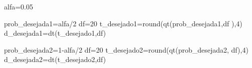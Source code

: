 \documentclass[
]{book}
\newenvironment{Shaded}{\begin{snugshade}}{\end{snugshade}}
\newcommand{\DecValTok}[1]{\textcolor[rgb]{0.00,0.00,0.81}{#1}}
\newcommand{\FloatTok}[1]{\textcolor[rgb]{0.00,0.00,0.81}{#1}}
\newcommand{\FunctionTok}[1]{\textcolor[rgb]{0.00,0.00,0.00}{#1}}
\newcommand{\NormalTok}[1]{#1}
\newcommand{\OtherTok}[1]{\textcolor[rgb]{0.56,0.35,0.01}{#1}}
\newcommand{\SpecialCharTok}[1]{\textcolor[rgb]{0.00,0.00,0.00}{#1}}
\begin{document}
\hfill\break

\begin{Shaded}
\begin{Highlighting}[]
\NormalTok{alfa}\OtherTok{=}\FloatTok{0.05}

\NormalTok{prob\_desejada1}\OtherTok{=}\NormalTok{alfa}\SpecialCharTok{/}\DecValTok{2}
\NormalTok{df}\OtherTok{=}\DecValTok{20}
\NormalTok{t\_desejado1}\OtherTok{=}\FunctionTok{round}\NormalTok{(}\FunctionTok{qt}\NormalTok{(prob\_desejada1,df ),}\DecValTok{4}\NormalTok{)}
\NormalTok{d\_desejada1}\OtherTok{=}\FunctionTok{dt}\NormalTok{(t\_desejado1,df)}

\NormalTok{prob\_desejada2}\OtherTok{=}\DecValTok{1}\SpecialCharTok{{-}}\NormalTok{alfa}\SpecialCharTok{/}\DecValTok{2}
\NormalTok{df}\OtherTok{=}\DecValTok{20}
\NormalTok{t\_desejado2}\OtherTok{=}\FunctionTok{round}\NormalTok{(}\FunctionTok{qt}\NormalTok{(prob\_desejada2, df),}\DecValTok{4}\NormalTok{)}
\NormalTok{d\_desejada2}\OtherTok{=}\FunctionTok{dt}\NormalTok{(t\_desejado2,df)}




\end{Highlighting}
\end{Shaded}
\end{document}
